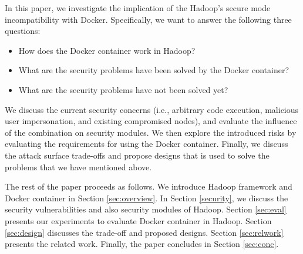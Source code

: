 In this paper, we investigate the implication of the Hadoop's secure mode incompatibility with Docker. Specifically, we want to answer the following three questions:
\begin{itemize}
\item {How does the Docker container work in Hadoop?}
\item {What are the security problems have been solved by the Docker container?}
\item {What are the security problems have not been solved yet?}
\end{itemize}

We discuss the current security concerns (i.e., arbitrary code execution, malicious user impersonation, and existing compromised nodes), and evaluate the influence of the combination on security modules. We then explore the introduced risks by evaluating the requirements for using the Docker container. Finally, we discuss the attack surface trade-offs and propose designs that is used to solve the problems that we have mentioned above.

The rest of the paper proceeds as follows. We introduce Hadoop framework and Docker container in Section \ref{sec:overview}. In Section \ref{security}, we discuss the security vulnerabilities and also security modules of Hadoop. Section \ref{sec:eval} presents our experiments to evaluate Docker container in Hadoop. Section \ref{sec:design} discusses the trade-off and proposed designs. Section \ref{sec:relwork} presents the related work. Finally, the paper concludes in Section \ref{sec:conc}.
